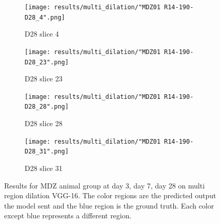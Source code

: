 \begin{figure}[!htb]
\medskip
\begin{subfigure}{0.25\textwidth}
  \texttt{[image: results/multi\_dilation/"MDZ01 R14-190-D28\_4".png]}
  \caption{D28 slice 4}
\end{subfigure}\hfil %
\begin{subfigure}{0.25\textwidth}
  \texttt{[image: results/multi\_dilation/"MDZ01 R14-190-D28\_23".png]}
  \caption{D28 slice 23}
\end{subfigure}\hfil %
\begin{subfigure}{0.25\textwidth}
  \texttt{[image: results/multi\_dilation/"MDZ01 R14-190-D28\_28".png]}
  \caption{D28 slice 28}
\end{subfigure}\hfil %
\begin{subfigure}{0.25\textwidth}
  \texttt{[image: results/multi\_dilation/"MDZ01 R14-190-D28\_31".png]}
  \caption{D28 slice 31}
\end{subfigure}
  
  \caption{Results for MDZ animal group at day 3, day 7, day 28 on multi region dilation VGG-16. The color regions are the predicted output the model sent and the blue region is the ground truth. Each color except blue represents a different region.}
  \label{fig:results_multi_dilation_MDZ}
\end{figure}



